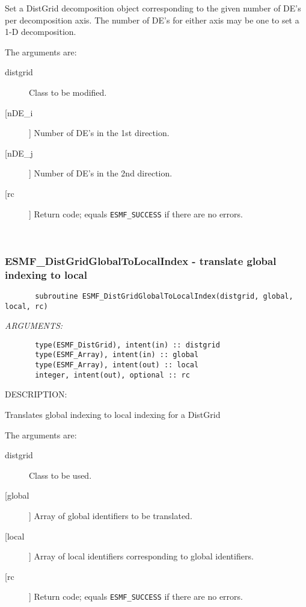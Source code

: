        Set a DistGrid decomposition object corresponding to the given number
       of DE's per decomposition axis.  The number of DE's for either axis
       may be one to set a 1-D decomposition.
  
       The arguments are:
       \begin{description}
       \item[distgrid] 
            Class to be modified.
       \item[[nDE\_i]]
            Number of DE's in the 1st direction.
       \item[[nDE\_j]]
            Number of DE's in the 2nd direction.
       \item[[rc]] 
            Return code; equals {\tt ESMF\_SUCCESS} if there are no errors.
       \end{description}
   
 
\mbox{}\hrulefill\ 
 
\subsubsection{ESMF\_DistGridGlobalToLocalIndex - translate global indexing to local}


 
\begin{verbatim}       subroutine ESMF_DistGridGlobalToLocalIndex(distgrid, global, local, rc)\end{verbatim}{\em ARGUMENTS:}
\begin{verbatim}       type(ESMF_DistGrid), intent(in) :: distgrid
       type(ESMF_Array), intent(in) :: global
       type(ESMF_Array), intent(out) :: local
       integer, intent(out), optional :: rc\end{verbatim}
{\sf DESCRIPTION:\\ }


       Translates global indexing to local indexing for a DistGrid
  
       The arguments are:
       \begin{description}
       \item[distgrid] 
            Class to be used.
       \item[[global]]
            Array of global identifiers to be translated.
       \item[[local]]
            Array of local identifiers corresponding to global identifiers.
       \item[[rc]] 
            Return code; equals {\tt ESMF\_SUCCESS} if there are no errors.
       \end{description}
   
